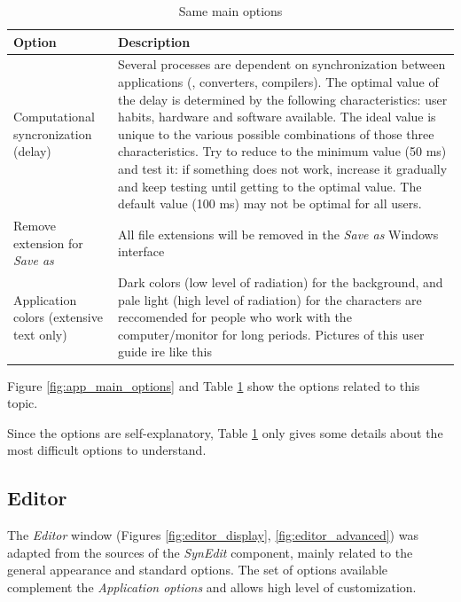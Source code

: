 \begin{table}
  \begin{footnotesize}
    \begin{tabularx}{\headwidth}{>{\hsize=0.35\hsize}X>{\hsize=0.65\hsize}X}\\
      \hline
      \textbf{Option} & \textbf{Description} \\
      \hline
      Computational syncronization (delay) & Several processes are dependent on synchronization between applications
       (\RR{}, converters, compilers). The optimal value of the delay is determined by the following characteristics:
       user habits, hardware and software available.
       The ideal value is unique to the various possible combinations of those three characteristics.
       Try to reduce to the minimum value (50 ms) and test it: if something does not work, increase it gradually
       and keep testing until getting to the optimal value. The default value (100 ms) may not be optimal for all users. \\
      Remove extension for \textit{Save as} & All file extensions will be removed
       in the \textit{Save as} Windows interface \\
      Application colors (extensive text only) & Dark colors (low level of radiation)
       for the background, and pale light (high level of radiation) for the characters
       are reccomended for people who work with the computer/monitor for long periods.
       Pictures of this user guide ire like this \\
      \hline
    \end{tabularx}
  \end{footnotesize}
  \caption{Same main options}
  \label{tab:app_main}
\end{table}

Figure \ref{fig:app_main_options} and
Table \ref{tab:app_main}
show the options related to this topic.

Since the options are self-explanatory, Table \ref{tab:app_main} only gives some
details about the most difficult options to understand.


\hypertarget{working_editor}{}
\subsection{Editor}

The \textit{Editor} window
(Figures \ref{fig:editor_display}, \ref{fig:editor_advanced})
was adapted from the sources of the
\textit{SynEdit} component, mainly related to the general appearance and
standard options. The set of options available complement the
\textit{Application options} and allows high level of customization.


